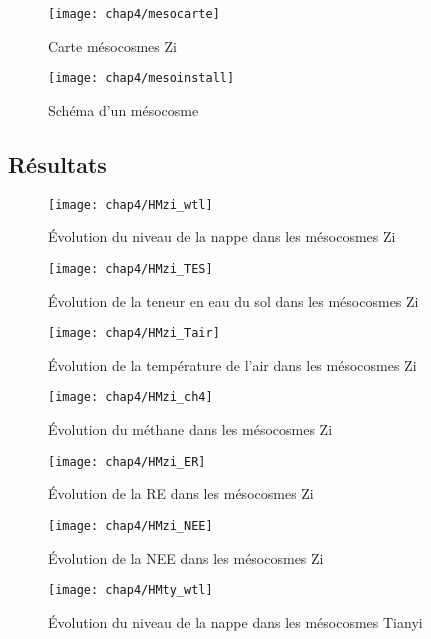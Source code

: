 \begin{figure}
\centering
\texttt{[image: chap4/mesocarte]}
\caption{Carte mésocosmes Zi}
\label{fig:mesocarte}
\end{figure}

\begin{figure}
\centering
\texttt{[image: chap4/mesoinstall]}
\caption{Schéma d'un mésocosme}
\label{fig:mesoinstall}
\end{figure}

\subsection{Résultats}

\begin{figure}
\centering
\texttt{[image: chap4/HMzi\_wtl]}
\caption{Évolution du niveau de la nappe dans les mésocosmes Zi}
\label{fig:HMzi_wtl}
\end{figure}

\begin{figure}
\centering
\texttt{[image: chap4/HMzi\_TES]}
\caption{Évolution de la teneur en eau du sol dans les mésocosmes Zi}
\label{fig:HMzi_TES}
\end{figure}

\begin{figure}
\centering
\texttt{[image: chap4/HMzi\_Tair]}
\caption{Évolution de la température de l'air dans les mésocosmes Zi}
\label{fig:HMzi_Tair}
\end{figure}

\begin{figure}
\centering
\texttt{[image: chap4/HMzi\_ch4]}
\caption{Évolution du méthane dans les mésocosmes Zi}
\label{fig:HMzi_ch4}
\end{figure}

\begin{figure}
\centering
\texttt{[image: chap4/HMzi\_ER]}
\caption{Évolution de la RE dans les mésocosmes Zi}
\label{fig:HMzi_ER}
\end{figure}

\begin{figure}
\centering
\texttt{[image: chap4/HMzi\_NEE]}
\caption{Évolution de la NEE dans les mésocosmes Zi}
\label{fig:HMzi_NEE}
\end{figure}


\begin{figure}
\centering
\texttt{[image: chap4/HMty\_wtl]}
\caption{Évolution du niveau de la nappe dans les mésocosmes Tianyi}
\label{fig:HMty_wtl}
\end{figure}

